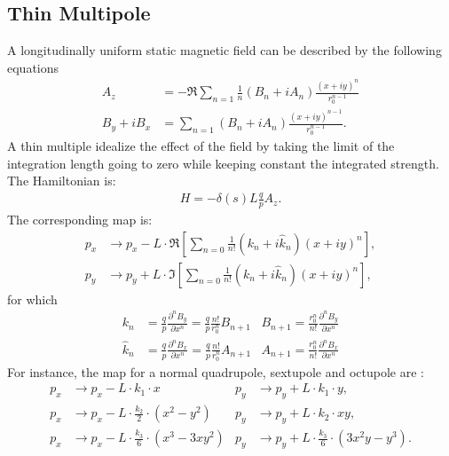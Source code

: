 \documentclass[english]{article}
\def\PnD#1#2#3{\frac{\partial^{#3} #1}{\partial #2^{#3}}}
\begin{document}
\subsection{Thin Multipole}
A longitudinally uniform static magnetic field can be described by the following equations
\begin{align}
  A_z&= - \Re \sum_{n=1} \frac1n \left(B_n+iA_n\right) 
    \frac{(x+iy)^n}{r_0^{n-1}}\\
    B_y+iB_x&=\sum_{n=1} \left(B_n+iA_n\right) \frac{(x+iy)^{n-1}}{r_0^{n-1}}.
\end{align}
A thin multiple idealize the effect of the field by taking the limit of the integration 
length going to zero while keeping constant the integrated strength. The Hamiltonian is:
\begin{align}
  H=- \delta(s) L \frac qp A_z.
\end{align}
The corresponding map is:
\begin{align}
  p_x &\to p_x - L\cdot\Re\left[\sum_{n=0} \frac{1}{n!} (k_n + i\hat k_n) (x+iy)^n \right], \\
  p_y &\to p_y + L\cdot\Im\left[\sum_{n=0} \frac{1}{n!} (k_n + i\hat k_n) (x+iy)^n \right],
\end{align}
for which
\begin{align}
  k_n&= \frac qp \PnD{B_y}{x}{n}
         = \frac qp \frac{n!}{r_0^n}  B_{n+1} &
  B_{n+1}= \frac {r_0^n}{n!}   \PnD{B_y}{x}{n} \\
  \hat k_n&= \frac qp \PnD{B_x}{x}{n}
         = \frac qp \frac{n!}{r_0^n}  A_{n+1} &
  A_{n+1}= \frac {r_0^n}{n!}   \PnD{B_x}{x}{n}
\end{align}
For instance, the map for a normal quadrupole, sextupole and octupole are :
\begin{align}
  p_x & \to p_x - L \cdot {k_1}\cdot x &
  p_y & \to p_y + L \cdot {k_1}\cdot y, \\
  p_x & \to p_x - L \cdot \frac{k_2}{2}\cdot (x^2-y^2) &
  p_y & \to p_y + L \cdot k_2 \cdot xy,\\
  p_x & \to p_x - L \cdot \frac{k_3}{6}\cdot(x^3 - 3xy^2) &
  p_y & \to p_y + L \cdot \frac{k_3}{6}\cdot(3x^2y - y^3) .
\end{align}
\end{document}
